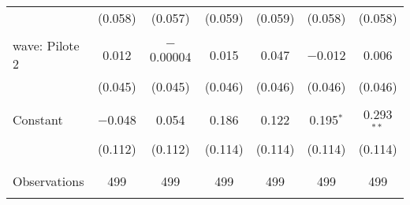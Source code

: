 \begin{tabular}{@{\extracolsep{5pt}}lcccccc}
  & (0.058) & (0.057) & (0.059) & (0.059) & (0.058) & (0.058) \\ 
  & & & & & & \\ 
 wave: Pilote 2 & 0.012 & $-$0.00004 & 0.015 & 0.047 & $-$0.012 & 0.006 \\ 
  & (0.045) & (0.045) & (0.046) & (0.046) & (0.046) & (0.046) \\ 
  & & & & & & \\ 
 Constant & $-$0.048 & 0.054 & 0.186 & 0.122 & 0.195$^{*}$ & 0.293$^{**}$ \\ 
  & (0.112) & (0.112) & (0.114) & (0.114) & (0.114) & (0.114) \\ 
  & & & & & & \\ 
\hline \\[-1.8ex] 

Observations & 499 & 499 & 499 & 499 & 499 & 499 \\ 
\hline 
\hline \\[-1.8ex] 
\end{tabular} 